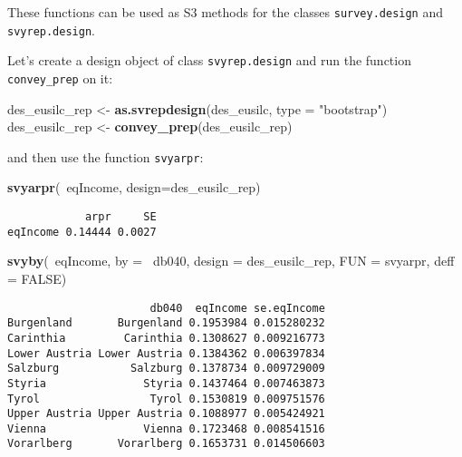 \documentclass[]{book}
\newenvironment{Shaded}{\begin{snugshade}}{\end{snugshade}}
\newcommand{\KeywordTok}[1]{\textcolor[rgb]{0.13,0.29,0.53}{\textbf{{#1}}}}
\newcommand{\DataTypeTok}[1]{\textcolor[rgb]{0.13,0.29,0.53}{{#1}}}
\newcommand{\StringTok}[1]{\textcolor[rgb]{0.31,0.60,0.02}{{#1}}}
\newcommand{\OtherTok}[1]{\textcolor[rgb]{0.56,0.35,0.01}{{#1}}}
\newcommand{\NormalTok}[1]{{#1}}
\begin{document}
These functions can be used as S3 methods for the classes
\texttt{survey.design} and \texttt{svyrep.design}.

Let's create a design object of class \texttt{svyrep.design} and run the
function \texttt{convey\_prep} on it:

\begin{Shaded}
\begin{Highlighting}[]
\NormalTok{des_eusilc_rep <-}\StringTok{ }\KeywordTok{as.svrepdesign}\NormalTok{(des_eusilc, }\DataTypeTok{type =} \StringTok{"bootstrap"}\NormalTok{)}
\NormalTok{des_eusilc_rep <-}\StringTok{ }\KeywordTok{convey_prep}\NormalTok{(des_eusilc_rep) }
\end{Highlighting}
\end{Shaded}

and then use the function \texttt{svyarpr}:

\begin{Shaded}
\begin{Highlighting}[]
\KeywordTok{svyarpr}\NormalTok{(~eqIncome, }\DataTypeTok{design=}\NormalTok{des_eusilc_rep)}
\end{Highlighting}
\end{Shaded}

\begin{verbatim}
            arpr     SE
eqIncome 0.14444 0.0027
\end{verbatim}

\begin{Shaded}
\begin{Highlighting}[]
\KeywordTok{svyby}\NormalTok{(~eqIncome, }\DataTypeTok{by =} \NormalTok{~db040, }\DataTypeTok{design =} \NormalTok{des_eusilc_rep, }\DataTypeTok{FUN =} \NormalTok{svyarpr, }\DataTypeTok{deff =} \OtherTok{FALSE}\NormalTok{)}
\end{Highlighting}
\end{Shaded}

\begin{verbatim}
                      db040  eqIncome se.eqIncome
Burgenland       Burgenland 0.1953984 0.015280232
Carinthia         Carinthia 0.1308627 0.009216773
Lower Austria Lower Austria 0.1384362 0.006397834
Salzburg           Salzburg 0.1378734 0.009729009
Styria               Styria 0.1437464 0.007463873
Tyrol                 Tyrol 0.1530819 0.009751576
Upper Austria Upper Austria 0.1088977 0.005424921
Vienna               Vienna 0.1723468 0.008541516
Vorarlberg       Vorarlberg 0.1653731 0.014506603
\end{verbatim}
\end{document}
